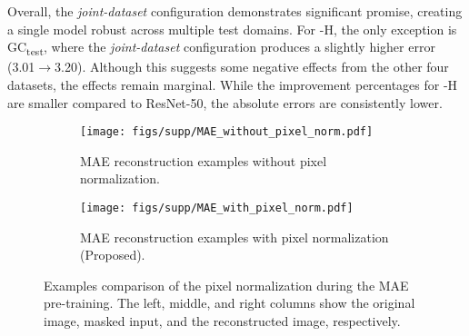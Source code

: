 Overall, the \textit{joint-dataset} configuration demonstrates significant promise, creating a single model robust across multiple test domains. 
For \methodname-H, the only exception is GC\textsubscript{test}, where the \textit{joint-dataset} configuration produces a slightly higher error (3.01$\rightarrow$3.20). 
Although this suggests some negative effects from the other four datasets, the effects remain marginal.
While the improvement percentages for \methodname-H are smaller compared to ResNet-50, the absolute errors are consistently lower.


\begin{table}[t]
    \centering
    \caption{
    We ablate the pre-training facial datasets by comparing real, synthetic, and novel-rendered images.
    The comparison is performed on the \methodname-B network, followed by training on XGaze.
    The last row represents the full-dataset setting.
    }
\label{table:ablation_data_type}
\end{table}


\begin{figure*}[t]
  \centering
  \begin{subfigure}{0.99\linewidth}
    \centering
    \texttt{[image: figs/supp/MAE\_without\_pixel\_norm.pdf]}
    \caption{ MAE reconstruction examples without pixel normalization.}
    \label{fig:no_pixel_norm}
  \end{subfigure}
  \begin{subfigure}{0.99\linewidth}
    \centering
    \texttt{[image: figs/supp/MAE\_with\_pixel\_norm.pdf]}
    \caption{ MAE reconstruction examples with pixel normalization (Proposed).}
    \label{fig:w_pixel_norm}
  \end{subfigure}
  \caption{Examples comparison of the pixel normalization during the MAE pre-training.
  The left, middle, and right columns show the original image, masked input, and the reconstructed image, respectively.
    }
  \label{fig:pixel_norm_samples}
\end{figure*}


